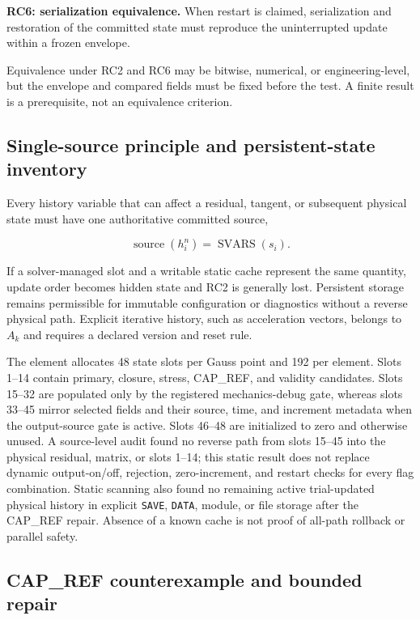 \documentclass[preprint,12pt,authoryear]{elsarticle}
\begin{document}
\textbf{RC6: serialization equivalence.} When restart is claimed, serialization and restoration of the committed state must reproduce the uninterrupted update within a frozen envelope.

Equivalence under RC2 and RC6 may be bitwise, numerical, or engineering-level, but the envelope and compared fields must be fixed before the test. A finite result is a prerequisite, not an equivalence criterion.

\subsection{Single-source principle and persistent-state inventory}

Every history variable that can affect a residual, tangent, or subsequent physical state must have one authoritative committed source,

\begin{equation}
\operatorname{source}(h_i^n)=\operatorname{SVARS}(s_i).
\end{equation}

If a solver-managed slot and a writable static cache represent the same quantity, update order becomes hidden state and RC2 is generally lost. Persistent storage remains permissible for immutable configuration or diagnostics without a reverse physical path. Explicit iterative history, such as acceleration vectors, belongs to $A_k$ and requires a declared version and reset rule.

The element allocates 48 state slots per Gauss point and 192 per element. Slots 1--14 contain primary, closure, stress, CAP\_\allowbreak{}REF, and validity candidates. Slots 15--32 are populated only by the registered mechanics-debug gate, whereas slots 33--45 mirror selected fields and their source, time, and increment metadata when the output-source gate is active. Slots 46--48 are initialized to zero and otherwise unused. A source-level audit found no reverse path from slots 15--45 into the physical residual, matrix, or slots 1--14; this static result does not replace dynamic output-on/off, rejection, zero-increment, and restart checks for every flag combination. Static scanning also found no remaining active trial-updated physical history in explicit \texttt{SAVE}, \texttt{DATA}, module, or file storage after the CAP\_\allowbreak{}REF repair. Absence of a known cache is not proof of all-path rollback or parallel safety.

\subsection{CAP\_\allowbreak{}REF counterexample and bounded repair}
\end{document}
